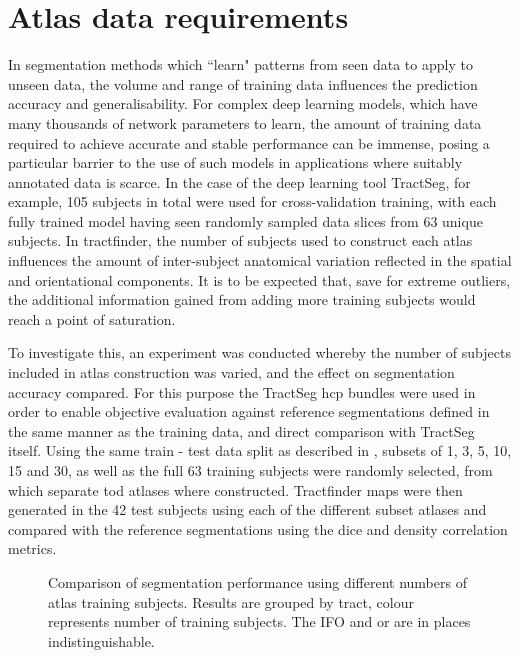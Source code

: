\section{Atlas data requirements}\label{sec:ntrain}

In segmentation methods which ``learn" patterns from seen data to apply to unseen data, the volume and range of training data influences the prediction accuracy and generalisability.
For complex deep learning models, which have many thousands of network parameters to learn, the amount of training data required to achieve accurate and stable performance can be immense, posing a particular barrier to the use of such models in applications where suitably annotated data is scarce.
In the case of the deep learning tool TractSeg\autocite{Wasserthal2018}, for example, 105 subjects in total were used for cross-validation training, with each fully trained model having seen randomly sampled data slices from 63 unique subjects.
In tractfinder, the number of subjects used to construct each atlas influences the amount of inter-subject anatomical variation reflected in the spatial and orientational components.
It is to be expected that, save for extreme outliers, the additional information gained from adding more training subjects would reach a point of saturation.

To investigate this, an experiment was conducted whereby the number of subjects included in atlas construction was varied, and the effect on segmentation accuracy compared.
For this purpose the TractSeg \gls{hcp} bundles were used in order to enable objective evaluation against reference segmentations defined in the same manner as the training data, and direct comparison with TractSeg itself.
Using the same train - test data split as described in \textcite{Wasserthal2018b}, subsets of 1, 3, 5, 10, 15 and 30, as well as the full 63 training subjects were randomly selected, from which separate \gls{tod} atlases where constructed.
Tractfinder maps were then generated in the 42 test subjects using each of the different subset atlases and compared with the reference segmentations using the \gls{dice} and density correlation metrics.

\begin{figure}[htb!]
    \centering
    \caption{Comparison of segmentation performance using different numbers of atlas training subjects. Results are grouped by tract, colour represents number of training subjects. The IFO and \gls{or} are in places indistinguishable. }
    \label{fig:ntrain}
\end{figure}

